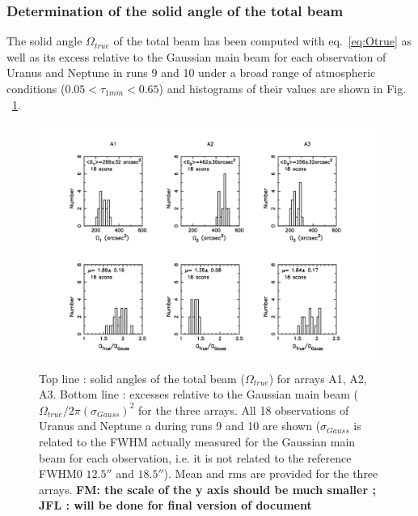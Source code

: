 \subsubsection{Determination of the solid angle of the total beam}
\label{S:solang}


The solid angle $\Omega_{true}$ of the total beam has been computed with  eq.~\ref{eq:Otrue}
as well as its excess relative to the Gaussian main beam 
for each  observation of Uranus and Neptune in  runs 9 and 10 under a broad range of atmospheric conditions
($0.05 < \tau_{1mm} < 0.65$)  and histograms of their values are shown in Fig. ~\ref{fig:Otrue}.

\begin{figure}[th]
\begin{center}
  \includegraphics[clip, angle=0, scale=0.6]{Figures/Hist_omega_true_and_excess.pdf}
  \caption[Total beam and Gaussian beam solid angles]{Top line : solid angles of the total beam
    ($\Omega_{true}$) for arrays A1, A2, A3. Bottom line :  excesses relative to the Gaussian main beam
   ($\Omega_{true} / 2 \pi (\sigma_{Gauss})^2$ for the three
   arrays. All 18 observations of Uranus and Neptune a
   during runs 9 and 10 are shown ($\sigma_{Gauss}$ is related to the FWHM actually measured for the
   Gaussian main beam for each observation, i.e. it is not related to the reference FWHM0 $12.5''$ and $18.5''$).
   Mean and rms are provided for the three arrays. {\bf FM: the scale of the
     y axis should be much smaller ; JFL : will be done for final
    version of document}}
\label{fig:Otrue}
\end{center}
\end{figure}

